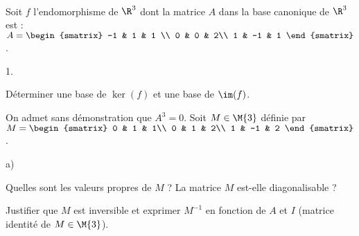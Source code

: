 \documentclass[11pt]{article}%
\begin{document}
\begin{exerciceSP}~\\
  Soit $f$ l'endomorphisme de $\R^3$ dont la matrice $A$ dans la base
  canonique de $\R^3$ est : $A = 
  \begin{smatrix} 
    -1 & 1 & 1 \\
    0 & 0 & 2\\
    1 & -1 & 1
  \end{smatrix}$.
  \begin{noliste}{1.}
    \setlength{\itemsep}{2mm}
  \item Déterminer une base de $\ker(f)$ et une base de $\im(f)$.
  \item On admet sans démonstration que $A^3=0$. Soit $M\in\M{3}$
    définie par $M = 
    \begin{smatrix} 
      0 & 1 & 1\\
      0 & 1 & 2\\
      1 & -1 & 2
    \end{smatrix}$.
    \begin{noliste}{a)}
    \setlength{\itemsep}{2mm}
    \item Quelles sont les valeurs propres de $M$ ? La matrice $M$
      est-elle diagonalisable ?
    \item Justifier que $M$ est inversible et exprimer $M^{-1}$ en
      fonction de $A$ et $I$ (matrice identité de $M\in\M{3}$).
    \end{noliste}
  \end{noliste}
\end{exerciceSP}


\newpage
\end{document}
